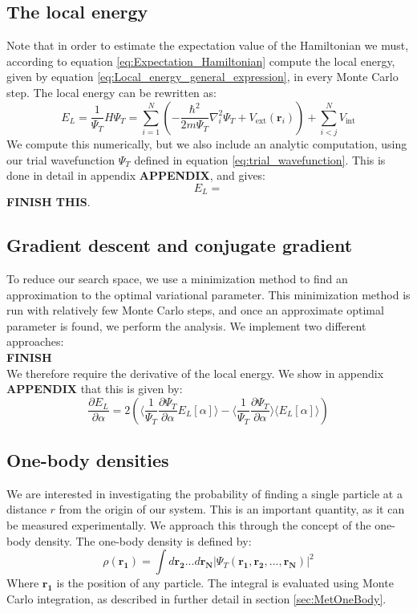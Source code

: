\documentclass[a4paper, 10pt]{article}
\begin{document}
	\subsection{The local energy}
	Note that in  order to estimate the expectation value of the Hamiltonian we must, according to equation \ref{eq:Expectation_Hamiltonian} compute the local energy, given by equation \ref{eq:Local_energy_general_expression}, in every Monte Carlo step. The local energy can be rewritten as:
	\begin{equation}
	E_L=\frac{1}{\Psi_T}H\Psi_T =\sum_{i=1}^N\left(-\frac{\hbar^2}{2m\Psi_T}\nabla_i^2 \Psi_T+V_{\mathrm{ext}}(\boldsymbol{r}_i)\right)+\sum_{i<j}^N V_{\mathrm{int}}
	\end{equation}
	We compute this numerically, but we also include an analytic computation, using our trial wavefunction $\Psi_T$ defined in equation \ref{eq:trial_wavefunction}. This is done in detail in appendix \textbf{APPENDIX}, and gives:
	\begin{equation}
	E_L=
	\end{equation}
	\textbf{FINISH THIS}.
	
	
	
	\subsection{Gradient descent and conjugate gradient}
	To reduce our search space, we use a minimization method to find an approximation to the optimal variational parameter. This minimization method is run with relatively few Monte Carlo steps, and once an approximate optimal parameter is found, we perform the analysis. We implement two different approaches:\\
	\textbf{FINISH}\\
	We therefore require the derivative of the local energy. We show in appendix \textbf{APPENDIX} that this is given by:
	\begin{equation}
	\frac{\partial E_L}{\partial \alpha}=2\left(\big\langle \frac{1}{\Psi_T}\frac{\partial \Psi_T}{\partial \alpha}E_L[\alpha]\big\rangle-\big\langle \frac{1}{\Psi_T}\frac{\partial \Psi_T}{\partial \alpha}\big\rangle \big\langle E_L[\alpha]\big\rangle\right)
	\end{equation}
	
	\subsection{One-body densities}
	We are interested in investigating the probability of finding a single particle at a distance $r$ from the origin of our system. This is an important quantity, as it can be measured experimentally. We approach this through the concept of the one-body density. The one-body density is defined by:
	\begin{equation}\label{eq:OneBodyDensity}
	\rho(\boldsymbol{r_1})=\int d\boldsymbol{r_2}...d\boldsymbol{r_N}|\Psi_T(\boldsymbol{r_1},\boldsymbol{r_2},...,\boldsymbol{r_N})|^2
	\end{equation}
	Where $\boldsymbol{r_1}$ is the position of any particle. The integral is evaluated using Monte Carlo integration, as described in further detail in section \ref{sec:MetOneBody}.
	
\end{document}
